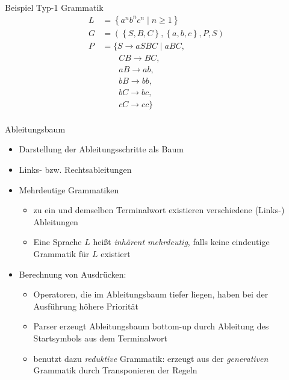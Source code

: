 \begin{frame}{Beispiel Typ-1 Grammatik}
	\begin{align*}
		L&=\left\{a^nb^nc^n \mid n \geq 1\right\}\\
		G&=\left(\left\{S,B,C\right\},\left\{a,b,c\right\},P,S\right)\\
		P&=\{S \rightarrow aSBC \mid aBC,\\
		         &\qquad CB \rightarrow BC,\\
		         &\qquad aB \rightarrow ab,\\
		         &\qquad bB \rightarrow bb,\\
		         &\qquad bC \rightarrow bc,\\
		         &\qquad cC \rightarrow cc\}\\
	\end{align*}
\end{frame}

\begin{frame}{Ableitungsbaum}
	\begin{itemize}
		\item Darstellung der Ableitungsschritte als Baum
		\item Links- bzw. Rechtsableitungen
		\item Mehrdeutige Grammatiken
		\begin{itemize}
			\item zu ein und demselben Terminalwort existieren verschiedene (Links-) Ableitungen
			\item Eine Sprache $L$ heißt \emph{inhärent mehrdeutig}, falls keine eindeutige Grammatik für $L$ existiert
		\end{itemize}
		\item Berechnung von Ausdrücken:
		\begin{itemize}
			\item Operatoren, die im Ableitungsbaum tiefer liegen, haben bei der Ausführung höhere Priorität
      \item Parser erzeugt Ableitungsbaum bottom-up durch Ableitung des Startsymbols aus dem Terminalwort
			\item benutzt dazu \emph{reduktive} Grammatik: erzeugt aus der \emph{generativen} Grammatik durch Transponieren der Regeln
		\end{itemize}
	\end{itemize}
\end{frame}

